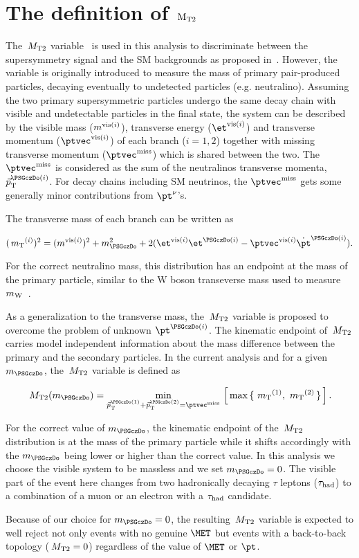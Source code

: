 \section{\texorpdfstring{The definition of $\rm {\ensuremath{\,{M_{\rm T2}}}}$}{The definition of MT2}}
\label{sect:mt2def}
The $\,{M_{\rm T2}}$ variable~\cite{Lester:1999tx,Barr:2003rg} is used in this analysis to discriminate between the supersymmetry signal and the SM backgrounds as proposed in~\cite{Barr:2009wu}. However, the variable is originally introduced to measure the mass of primary pair-produced particles, decaying eventually to undetected particles (e.g. neutralino). Assuming the two primary supersymmetric particles undergo the same decay chain with visible and undetectable particles in the final state, the system can be described by the visible mass ($m^{{\rm vis}(i)}$), transverse energy ($\etvisi$) and transverse momentum ($\vptvisi$) of each branch ($i=1,2$) together with missing transverse momentum ($\ptvecmiss$) which is shared between the two. The $\ptvecmiss$ is considered as the sum of the neutralinos transverse momenta, $\vec{p}_{\rm T}^{\PSGczDo(i)}$. For decay chains including SM neutrinos, the $\ptvecmiss$ gets some generally minor contributions from $\pt^{\nu}$'s.

The transverse mass of each branch can be written as 
\begin{linenomath}
\begin{equation}
\label{eq:mtdef}
(\mt^{(i)})^{2}= (\mvisi)^2+m^2_{\PSGczDo}+2(\etvisi\et^{\PSGczDo(i)}-\vptvisi\dot\pt^{\PSGczDo(i)}).
\end{equation}
\end{linenomath}
For the correct neutralino mass, this distribution has an endpoint at the mass of the primary particle, similar to the W boson transeverse mass used to measure $m_{\rm W}$~\cite{Arnison:1983rp,Banner:1983jy,Affolder:2000bpa,Abazov:2002bu}. 

As a generalization to the transverse mass, the $\,{M_{\rm T2}}$ variable is proposed to overcome the problem of unknown $\pt^{\PSGczDo(i)}$. The kinematic endpoint of $\,{M_{\rm T2}}$ carries model independent information about the mass difference between the primary and the secondary particles. In the current analysis and for a given $m_{\PSGczDo}$, the $\,{M_{\rm T2}}$ variable is defined as
\begin{linenomath}
\begin{equation}
\label{eq:mt2def}
\mttwo(m_{\PSGczDo})= \min_{\vec{p}_{\rm T}^{\PSGczDo(1)}+\vec{p}_{\rm T}^{\PSGczDo(2)}=\ptvecmiss}\,\left[\,\max\,\{ \, \mt^{(1)},\,\mt^{(2)}\,\}\,\right].
\end{equation}
\end{linenomath}
For the correct value of $m_{\PSGczDo}$, the kinematic endpoint of the $\,{M_{\rm T2}}$ distribution is at the mass of the primary particle while it shifts accordingly with the $m_{\PSGczDo}$ being lower or higher than the correct value. In this analysis we choose the visible system to be massless and we set $m_{\PSGczDo}=0$. The visible part of the event here changes from two hadronically decaying $\tau$ leptons ($\tau_{\rm had}$) to a combination of a muon or an electron with a $\tau_{\rm had}$ candidate. 

Because of our choice for $m_{\PSGczDo}=0$, the resulting $\,{M_{\rm T2}}$ variable is expected to well reject not only events with no genuine $\MET$ but events with a back-to-back topology ($\,{M_{\rm T2}}=0$) regardless of the value of $\MET$ or $\pt$. 
